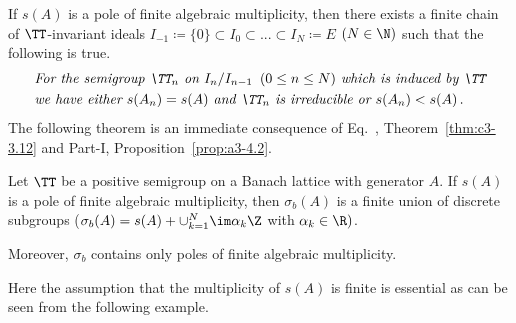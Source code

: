 If\/ $s(A)$ is a pole of finite algebraic multiplicity, then there exists a finite chain of\/ $\TT$-invariant ideals $I_{-1} \coloneqq  \{0\} \subset I_{0}\subset ... \subset I_{N} \coloneqq  E$ $(N\in\N)$ such that the following is true.
\begin{equation}\label{eq:c3-3.19}
	\begin{split}
	&\textit{For the semigroup $\TT_{n}$ on $I_{n}/I_{n-1}\, \ (0 \leq n \leq N)$ which is induced by $\TT$}
		\\
	& \textit{we have either $s(A_{n}) = s(A)$ and $\TT_{n}$ is irreducible or $s(A_{n}) < s(A)$}\,.
	\end{split}
\end{equation}
The following theorem is an immediate consequence of Eq.~, Theorem~\ref{thm:c3-3.12} and Part-I, Proposition~\ref{prop:a3-4.2}.

\begin{theorem}\label{thm:c3-3.14}
%
	Let $\TT$ be a positive semigroup on a Banach lattice with generator $A$. 
	If\/ $s(A)$ is a pole of finite algebraic multiplicity, then $\sigma_{b}(A)$ is a finite union of discrete subgroups (\ie  $\sigma_{b}(A) = s(A) + \cup_{k=1}^{N}\im\alpha_{k}\Z$ with $\alpha_{k} \in \R )$.
	
	Moreover, $\sigma_{b}$ contains only poles of finite algebraic multiplicity.
\end{theorem}

Here the assumption that the multiplicity of\/ $s(A)$ is finite is essential as can be seen from the following example.

